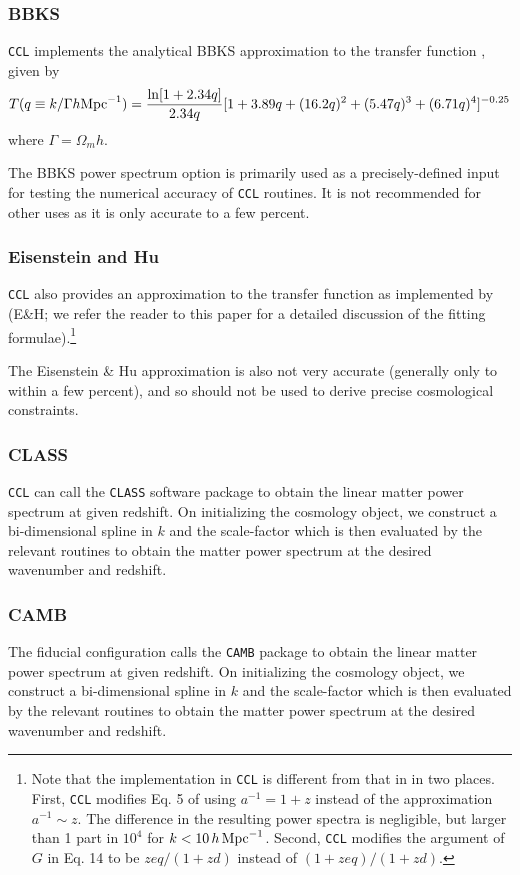 \documentclass[\docopts]{\docclass}
\newcommand{\ccl}{{\tt CCL}\xspace}
\begin{document}
\subsubsection{BBKS}
\ccl implements the analytical BBKS approximation to the transfer function \citep{BBKS}, given by
\begin{equation}
T(q\equiv k/\Gamma h {\rm Mpc}^{-1}) = \frac{\ln[1+2.34q]}{2.34q}[1+3.89q+(16.2q)^2+(5.47q)^3+(6.71q)^4]^{-0.25}
\end{equation}
where $\Gamma = \Omega_m h$.

The BBKS power spectrum option is primarily used as a precisely-defined input
for testing the numerical accuracy of \ccl routines. It is not recommended for
other uses as it is only accurate to a few percent.

\subsubsection{Eisenstein and Hu}
\ccl also provides an approximation to the transfer function as implemented by
\citet{1998ApJ...496..605E} (E\&H; we refer the reader to this paper for a detailed
discussion of the fitting formulae).\footnote{
  Note that the implementation in \ccl is different from that in \citet{1998ApJ...496..605E}
  in two places. First, \ccl modifies Eq. 5 of \citet{1998ApJ...496..605E} using
  $a^{-1}=1+z$ instead of the approximation $a^{-1}\sim z$. The difference
  in the resulting power spectra is negligible, but larger than 1 part
  in $10^4$ for $k<10\,h\,{\rm Mpc}^{-1}$. Second, \ccl modifies the argument of
  $G$ in Eq. 14 to be $zeq/(1+zd)$ instead of $(1+zeq)/(1+zd)$.}

The Eisenstein \& Hu approximation is also not very accurate (generally only
to within a few percent), and so should not be used to derive
precise cosmological constraints.

\subsubsection{CLASS}
\ccl can call the {\tt CLASS} software package \citep{class}
to obtain the linear matter power spectrum at given redshift. On
initializing the cosmology object, we construct a bi-dimensional spline in $k$
and the scale-factor which is then evaluated by the relevant routines to obtain
the matter power spectrum at the desired wavenumber and redshift.

\subsubsection{CAMB}
The fiducial configuration calls the {\tt CAMB} package \citep{camb}
to obtain the linear matter power spectrum at given redshift. On
initializing the cosmology object, we construct a bi-dimensional spline in $k$
and the scale-factor which is then evaluated by the relevant routines to obtain
the matter power spectrum at the desired wavenumber and redshift.
\end{document}
